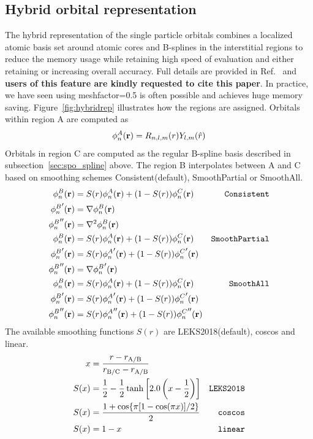 \subsection{Hybrid orbital representation}
\label{sec:spo_hybrid}
The hybrid representation of the single particle orbitals combines a localized atomic basis set around atomic cores and B-splines in the interstitial regions to reduce the memory usage while retaining high speed of evaluation and either retaining or increasing overall accuracy. Full details are provided in Ref.~\cite{Luo2018hyb} and \textbf{users of this feature are kindly requested to cite this paper}.
In practice, we have seen using meshfactor=0.5 is often possible and achieves huge memory saving.
Figure~\ref{fig:hybridrep} illustrates how the regions are assigned. Orbitals within region A are computed as
\[
  \phi^A_n({\bf r})=R_{n,l,m}(r)Y_{l,m}(\hat{r})
\]
Orbitals in region C are computed as the regular B-spline basis described in subsection~\ref{sec:spo_spline} above. The region B interpolates between A and C based on smoothing schemes Consistent(default), SmoothPartial or SmoothAll.
\begin{align}
  \phi^B_n({\bf r}) & = S(r) \phi^A_n({\bf r}) + (1-S(r))\phi^C_n({\bf r}) & \texttt{Consistent} \\
  {\phi^B_n}'({\bf r}) & = \nabla\phi^B_n({\bf r}) \nonumber \\
  {\phi^B_n}''({\bf r}) & = \nabla^2\phi^B_n({\bf r}) \nonumber \\
  \phi^B_n({\bf r}) & = S(r) \phi^A_n({\bf r}) + (1-S(r))\phi^C_n({\bf r}) & \texttt{SmoothPartial} \\
  {\phi^B_n}'({\bf r}) & = S(r) {\phi^A_n}'({\bf r}) + (1-S(r)){\phi^C_n}'({\bf r}) \nonumber \\
  {\phi^B_n}''({\bf r}) & = \nabla{\phi^B_n}'({\bf r}) \nonumber \\
  \phi^B_n({\bf r}) & = S(r) \phi^A_n({\bf r}) + (1-S(r))\phi^C_n({\bf r}) & \texttt{SmoothAll} \\
  {\phi^B_n}'({\bf r}) & = S(r) {\phi^A_n}'({\bf r}) + (1-S(r)){\phi^C_n}'({\bf r}) \nonumber \\
  {\phi^B_n}''({\bf r}) & = S(r) {\phi^A_n}''({\bf r}) + (1-S(r)){\phi^C_n}''({\bf r}) \nonumber
\end{align}
The available smoothing functions $S(r)$ are LEKS2018(default), coscos and linear.
\begin{align}
                   x &= \frac{r-r_{\rm A/B}}{r_{\rm B/C}-r_{\rm A/B}} & \\
                S(x) &= \frac{1}{2}-\frac{1}{2}\tanh\left[2.0\left(x-\frac{1}{2}\right)\right] & \texttt{LEKS2018} \\
                S(x) &= \frac{1+\cos\{\pi [1-\cos(\pi x)]/2\}}{2} & \texttt{coscos} \\
                S(x) &= 1-x & \texttt{linear}
\end{align}

